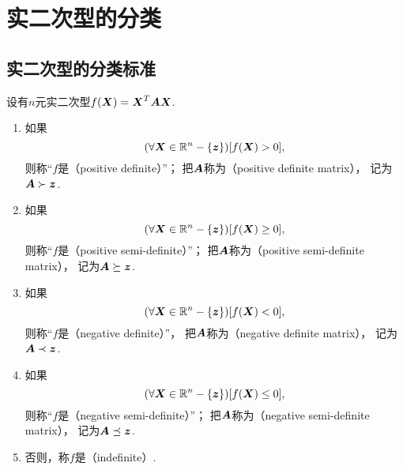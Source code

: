 \section{实二次型的分类}
\subsection{实二次型的分类标准}
\begin{definition}
设有\(n\)元实二次型\(f(\boldsymbol{X}) = \boldsymbol{X}^T\boldsymbol{A}\boldsymbol{X}\).
\begin{enumerate}
	\item 如果\[
		(\forall\boldsymbol{X}\in\mathbb{R}^n-\{\boldsymbol{z}\})
		[f(\boldsymbol{X}) > 0],
	\]
	则称“\(f\)是（positive definite）”；
	把\(\boldsymbol{A}\)称为（positive definite matrix），
	记为\(\boldsymbol{A}\succ\boldsymbol{z}\).

	\item 如果\[
		(\forall\boldsymbol{X}\in\mathbb{R}^n-\{\boldsymbol{z}\})
		[f(\boldsymbol{X}) \geq 0],
	\]
	则称“\(f\)是（positive semi-definite）”；
	把\(\boldsymbol{A}\)称为（positive semi-definite matrix），
	记为\(\boldsymbol{A}\succeq\boldsymbol{z}\).

	\item 如果\[
		(\forall\boldsymbol{X}\in\mathbb{R}^n-\{\boldsymbol{z}\})
		[f(\boldsymbol{X}) < 0],
	\]
	则称“\(f\)是（negative definite）”，
	把\(\boldsymbol{A}\)称为（negative definite matrix），
	记为\(\boldsymbol{A}\prec\boldsymbol{z}\).

	\item 如果\[
		(\forall\boldsymbol{X}\in\mathbb{R}^n-\{\boldsymbol{z}\})
		[f(\boldsymbol{X}) \leq 0],
	\]
	则称“\(f\)是（negative semi-definite）”；
	把\(\boldsymbol{A}\)称为（negative semi-definite matrix），
	记为\(\boldsymbol{A}\preceq\boldsymbol{z}\).

	\item 否则，称\(f\)是（indefinite）.
\end{enumerate}
\end{definition}

